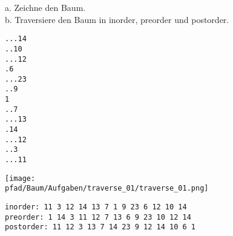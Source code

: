 \question[4]
a. Zeichne den Baum. \\
b. Traversiere den Baum in inorder, preorder und postorder.
\begin{lstlisting}
...14
..10
...12
.6
...23
..9
1
..7
...13
.14
...12
..3
...11
\end{lstlisting}

\begin{solutionbox}{8cm}
\texttt{[image: \\pfad/Baum/Aufgaben/traverse\_01/traverse\_01.png]}
\begin{lstlisting}
inorder: 11 3 12 14 13 7 1 9 23 6 12 10 14
preorder: 1 14 3 11 12 7 13 6 9 23 10 12 14
postorder: 11 12 3 13 7 14 23 9 12 14 10 6 1
\end{lstlisting}
\end{solutionbox}

